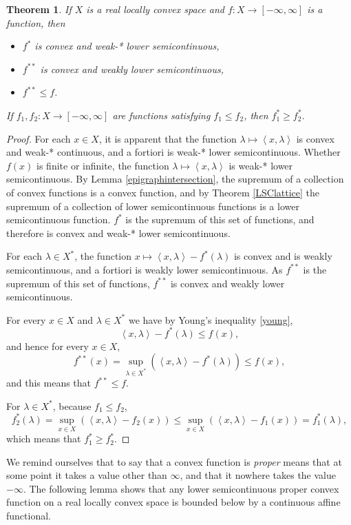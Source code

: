 \documentclass{article}
\newcommand{\inner}[2]{\left\langle #1, #2 \right\rangle}
\newtheorem{theorem}{Theorem}
\theoremstyle{definition}
\begin{document}
\begin{theorem}
If $X$ is a real locally convex space and $f:X \to [-\infty,\infty]$ is a function, then
\begin{itemize}
\item $f^*$ is convex and weak-* lower semicontinuous,
\item $f^{**}$ is convex and weakly lower semicontinuous,
\item $f^{**} \leq f$.
\end{itemize}
If $f_1,f_2:X \to [-\infty,\infty]$ are functions satisfying $f_1 \leq f_2$,
then $f_1^* \geq f_2^*$. 
\label{conjugateproperties}
\end{theorem}
\begin{proof}
For each $x \in X$, it is apparent that the function $\lambda \mapsto \inner{x}{\lambda}$ is convex and weak-* continuous, and a fortiori
 is weak-* lower semicontinuous.
Whether $f(x)$ is finite or infinite, the function $\lambda \mapsto \inner{x}{\lambda}$ is weak-* lower semicontinuous.
By Lemma \ref{epigraphintersection}, the supremum of a collection of convex functions is a convex function, and by Theorem \ref{LSClattice}
 the supremum of a collection of lower semicontinuous functions is a lower semicontinuous function.
$f^*$ is the supremum of this set of functions, and therefore is convex and weak-* lower semicontinuous.

For each $\lambda \in X^*$,
the function $x \mapsto \inner{x}{\lambda}-f^*(\lambda)$ is convex and is weakly  semicontinuous, and a fortiori is weakly
lower semicontinuous. As $f^{**}$ is the supremum of this set of functions, $f^{**}$ is convex and weakly lower semicontinuous.

For every $x \in X$ and  $\lambda \in X^*$ we have by Young's inequality \eqref{young},
\[
\inner{x}{\lambda}-f^*(\lambda) \leq f(x),
\]
and hence for every $x \in X$,
\[
f^{**}(x) = \sup_{\lambda \in X^*} (\inner{x}{\lambda}-f^*(\lambda)) \leq f(x),
\]
and this means that $f^{**} \leq f$.

For $\lambda \in X^*$, because $f_1 \leq f_2$,
\[
f_2^*(\lambda) = \sup_{x \in X} ( \inner{x}{\lambda}-f_2(x)) \leq \sup_{x \in X} (\inner{x}{\lambda}-f_1(x)) = f_1^*(\lambda),
\]
which means that $f_1^* \geq f_2^*$.
\end{proof}



We remind ourselves that to say that a convex function  is {\em proper} means that at some point it takes a value other than $\infty$,
and that it nowhere  takes the value $-\infty$. The following lemma shows that any lower semicontinuous proper convex function
on a real locally convex space  is bounded below by a continuous affine functional.
\end{document}
